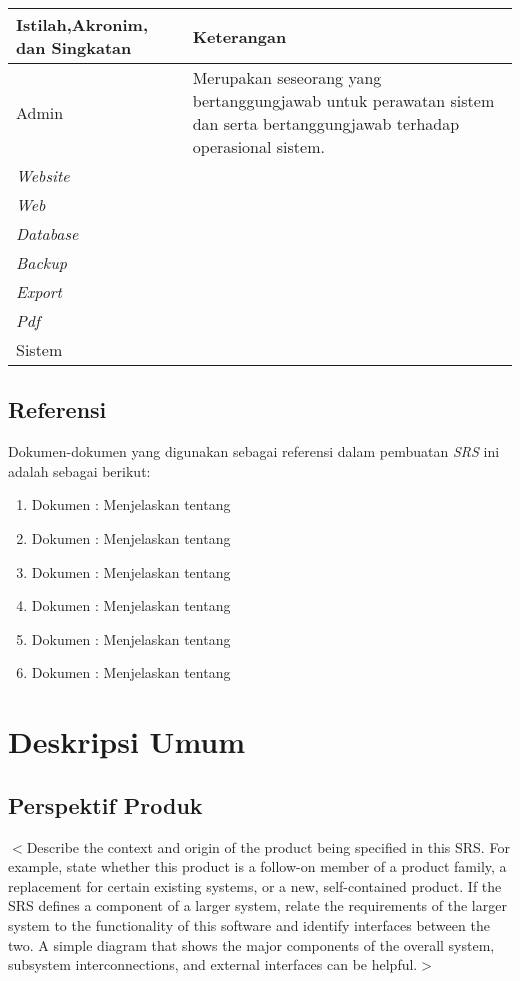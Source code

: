 \documentclass{scrreprt}
\begin{document}
\begin{center}
	\begin{tabular}{|>{\centering\arraybackslash}m{5cm}|>{\centering\arraybackslash}m{9cm}|}
		\hline
			Istilah,Akronim, dan Singkatan & Keterangan\\
		\hline
			Admin & Merupakan seseorang yang bertanggungjawab untuk perawatan sistem dan  serta bertanggungjawab terhadap operasional sistem.\\
		\hline
			\emph{Website} & \\
		\hline
			\emph{Web} & \\
		\hline
			\emph{Database} & \\
		\hline
			\emph{Backup} & \\
		\hline
			\emph{Export} & \\
		\hline
			\emph{Pdf} & \\
		\hline
			Sistem & \\
		\hline
	\end{tabular}
\end{center}



\section{Referensi}
Dokumen-dokumen yang digunakan sebagai referensi dalam pembuatan \emph{SRS} ini adalah sebagai berikut:

\begin{enumerate}
	\item Dokumen : Menjelaskan tentang
	\item Dokumen : Menjelaskan tentang
	\item Dokumen : Menjelaskan tentang
	\item Dokumen : Menjelaskan tentang
	\item Dokumen : Menjelaskan tentang
	\item Dokumen : Menjelaskan tentang
\end{enumerate}




\chapter{Deskripsi Umum}

\section{Perspektif Produk}
$<$Describe the context and origin of the product being specified in this SRS.  
For example, state whether this product is a follow-on member of a product 
family, a replacement for certain existing systems, or a new, self-contained 
product. If the SRS defines a component of a larger system, relate the 
requirements of the larger system to the functionality of this software and 
identify interfaces between the two. A simple diagram that shows the major 
components of the overall system, subsystem interconnections, and external 
interfaces can be helpful.$>$
\end{document}
